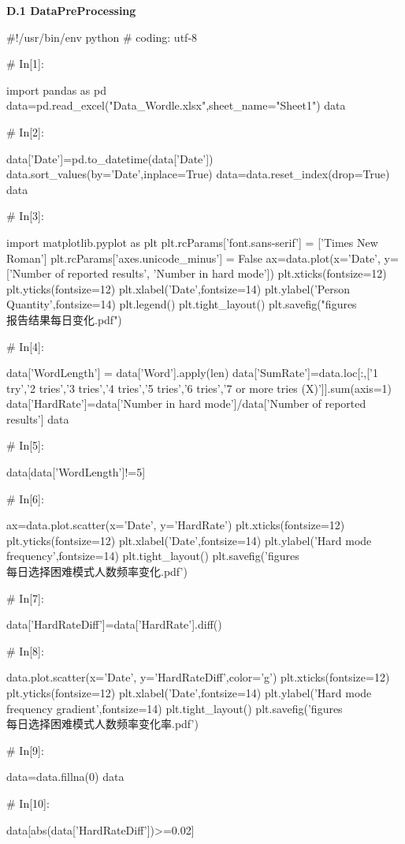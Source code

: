 \documentclass{MathModeling}
\begin{document}
\textbf{D.1 DataPreProcessing}
\begin{python}
#!/usr/bin/env python
# coding: utf-8

# In[1]:


import pandas as pd
data=pd.read_excel("Data_Wordle.xlsx",sheet_name="Sheet1")
data


# In[2]:


data['Date']=pd.to_datetime(data['Date'])
data.sort_values(by='Date',inplace=True)
data=data.reset_index(drop=True)
data


# In[3]:


import matplotlib.pyplot as plt
plt.rcParams['font.sans-serif'] = ['Times New Roman']
plt.rcParams['axes.unicode_minus'] = False
ax=data.plot(x='Date', y=['Number of reported results', 'Number in hard mode'])
plt.xticks(fontsize=12)
plt.yticks(fontsize=12)
plt.xlabel('Date',fontsize=14)
plt.ylabel('Person Quantity',fontsize=14)
plt.legend()
plt.tight_layout()
plt.savefig("figures\\报告结果每日变化.pdf")


# In[4]:


data['WordLength'] = data['Word'].apply(len)
data['SumRate']=data.loc[:,['1 try','2 tries','3 tries','4 tries','5 tries','6 tries','7 or more tries (X)']].sum(axis=1)
data['HardRate']=data['Number in hard mode']/data['Number of reported results']
data


# In[5]:


data[data['WordLength']!=5]


# In[6]:


ax=data.plot.scatter(x='Date', y='HardRate')
plt.xticks(fontsize=12)
plt.yticks(fontsize=12)
plt.xlabel('Date',fontsize=14)
plt.ylabel('Hard mode frequency',fontsize=14)
plt.tight_layout()
plt.savefig('figures\\每日选择困难模式人数频率变化.pdf')


# In[7]:


data['HardRateDiff']=data['HardRate'].diff()


# In[8]:


data.plot.scatter(x='Date', y='HardRateDiff',color='g')
plt.xticks(fontsize=12)
plt.yticks(fontsize=12)
plt.xlabel('Date',fontsize=14)
plt.ylabel('Hard mode frequency gradient',fontsize=14)
plt.tight_layout()
plt.savefig('figures\\每日选择困难模式人数频率变化率.pdf')


# In[9]:


data=data.fillna(0)
data


# In[10]:


data[abs(data['HardRateDiff'])>=0.02]


\end{python}
\end{document}
